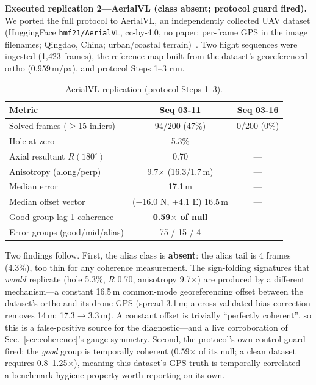 \documentclass[journal]{IEEEtran}
\begin{document}
\textbf{Executed replication 2---AerialVL (class absent; protocol guard fired).} We ported the full protocol to AerialVL, an independently collected UAV dataset (HuggingFace \texttt{hmf21/AerialVL}, cc-by-4.0, no paper; per-frame GPS in the image filenames; Qingdao, China; urban/coastal terrain)~\cite{aerialvl}. Two flight sequences were ingested (1{,}423 frames), the reference map built from the dataset's georeferenced ortho (0.959\,m/px), and protocol Steps 1--3 run.

\begin{table}[t]
\caption{AerialVL replication (protocol Steps 1--3).}
\label{tab:aerialvl}
\centering
\footnotesize
\begin{tabular}{@{}lcc@{}}
\toprule
Metric & Seq 03-11 & Seq 03-16 \\
\midrule
Solved frames ($\geq$15 inliers) & 94/200 (47\%) & 0/200 (0\%) \\
Hole at zero & 5.3\% & --- \\
Axial resultant $R(180^{\circ})$ & 0.70 & --- \\
Anisotropy (along/perp) & 9.7$\times$ (16.3/1.7\,m) & --- \\
Median error & 17.1\,m & --- \\
Median offset vector & ($-$16.0 N, +4.1 E) 16.5\,m & --- \\
Good-group lag-1 coherence & \textbf{0.59$\times$ of null} & --- \\
Error groups (good/mid/alias) & 75 / 15 / 4 & --- \\
\bottomrule
\end{tabular}
\end{table}

Two findings follow. First, the alias class is \textbf{absent}: the alias tail is 4 frames (4.3\%), too thin for any coherence measurement. The sign-folding signatures that \emph{would} replicate (hole 5.3\%, $R$ 0.70, anisotropy 9.7$\times$) are produced by a different mechanism---a constant 16.5\,m common-mode georeferencing offset between the dataset's ortho and its drone GPS (spread 3.1\,m; a cross-validated bias correction removes 14\,m: 17.3$\to$3.3\,m). A constant offset is trivially ``perfectly coherent'', so this is a false-positive source for the diagnostic---and a live corroboration of Sec.~\ref{sec:coherence}'s gauge symmetry. Second, the protocol's own control guard fired: the \emph{good} group is temporally coherent (0.59$\times$ of its null; a clean dataset requires 0.8--1.25$\times$), meaning this dataset's GPS truth is temporally correlated---a benchmark-hygiene property worth reporting on its own.
\end{document}
